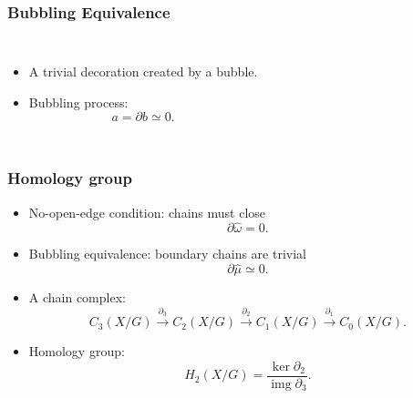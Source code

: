 \documentclass[xcolor=table, 10pt, aspectratio=43]{beamer}
\DeclareMathOperator{\img}{img}
\begin{document}
\begin{frame}
	\frametitle{Bubbling Equivalence}
\begin{columns}
\begin{itemize}
\item A trivial decoration created by a bubble.
\item Bubbling process:
\[a = \partial b \simeq0.\]
\end{itemize}
\begin{animateinline}{5}
\end{animateinline}
\end{columns}
\end{frame}

\begin{frame}
  \frametitle{Homology group}
\begin{itemize}
  \item No-open-edge condition: chains must close
  \[\partial \hat\omega=0.\]
  \item Bubbling equivalence: boundary chains are trivial
  \[\partial\hat\mu \simeq 0.\]
  \item A chain complex:
  \[C_3(X/G)\xrightarrow{\partial_3}C_2(X/G)\xrightarrow{\partial_2}C_1(X/G)
  \xrightarrow{\partial_1}C_0(X/G).\]
  \item Homology group:
  \[H_2(X/G) = \frac{\ker\partial_2}{\img\partial_3}.\]
\end{itemize}
\end{frame}
\end{document}
